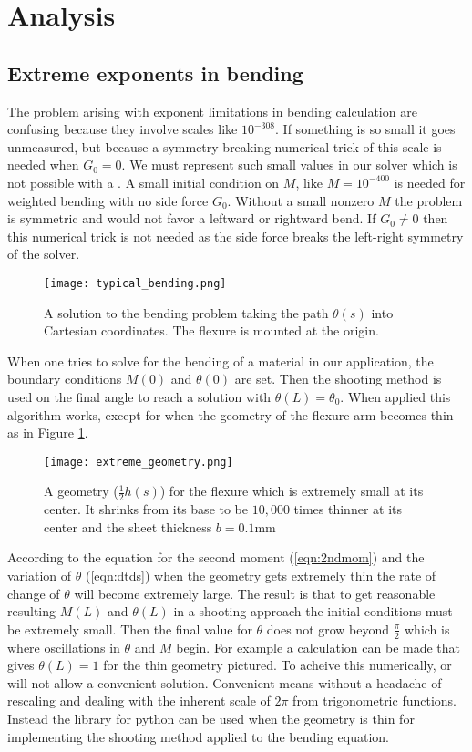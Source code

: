 \documentclass[12pt,reqno]{article}
\begin{document}
	\section{Analysis}
	\subsection{Extreme exponents in bending}

	The problem arising with exponent limitations in bending calculation are confusing because they involve scales like $10^{-308}$. If something is so small it goes unmeasured, but because a symmetry breaking numerical trick of this scale is needed when $G_{0} = 0$. We must represent such small values in our solver which is not possible with a . A small initial condition on $M$, like $M = 10^{-400}$ is needed for weighted bending with no side force $G_{0}$. Without a small nonzero $M$ the problem is symmetric and would not favor a leftward or rightward bend. If $G_{0} \neq 0$ then this numerical trick is not needed as the side force breaks the left-right symmetry of the solver.
	\begin{figure}[H]
		\texttt{[image: typical\_bending.png]}
		\caption{A solution to the bending problem taking the path $\theta(s)$ into Cartesian coordinates. The flexure is mounted at the origin. }
	\end{figure}
	When one tries to solve for the bending of a material in our application, the boundary conditions $M(0)$ and $\theta(0)$ are set. Then the shooting method is used on the final angle to reach a solution with $\theta(L) = \theta_{0}$. When applied this algorithm works, except for when the geometry of the flexure arm becomes thin as in Figure \ref{fig:geom}.
		\begin{figure}[H]
		\texttt{[image: extreme\_geometry.png]}\label{fig:geom}
		\caption{A geometry ($\frac{1}{2}h(s)$) for the flexure which is extremely small at its center. It shrinks from its base to be $10,000$ times thinner at its center and the sheet thickness $b = 0.1$mm }
	\end{figure}
	According to the equation for the second moment (\ref{eqn:2ndmom}) and the variation of $\theta$ (\ref{eqn:dtds}) when the geometry gets extremely thin the rate of change of $\theta$ will become extremely large. The result is that to get reasonable resulting $M(L)$ and $\theta(L)$ in a shooting approach the initial conditions must be extremely small. Then the final value for $\theta$ does not grow beyond $\frac{\pi}{2}$ which is where oscillations in $\theta$ and $M$ begin. For example a calculation can be made that gives $\theta(L) = 1$ for the thin geometry pictured. To acheive this numerically,  or  will not allow a convenient solution. Convenient means without a headache of rescaling and dealing with the inherent scale of $2\pi$ from trigonometric functions. Instead the  library for python can be used when the geometry is thin for implementing the shooting method applied to the bending equation.
\end{document}
